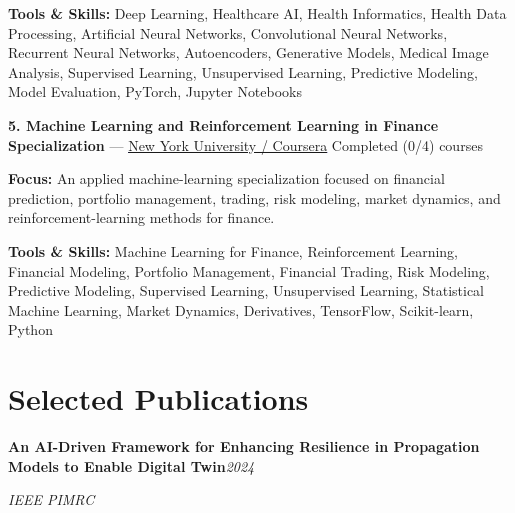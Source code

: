 \documentclass[9pt,letterpaper]{extarticle}
\newcommand{\entry}[2]{\Needspace{4\baselineskip}\textbf{#1}\hfill\textit{#2}\par}
\begin{document}
{\small\textbf{Tools \& Skills:} Deep Learning, Healthcare AI, Health Informatics, Health Data Processing, Artificial Neural Networks, Convolutional Neural Networks, Recurrent Neural Networks, Autoencoders, Generative Models, Medical Image Analysis, Supervised Learning, Unsupervised Learning, Predictive Modeling, Model Evaluation, PyTorch, Jupyter Notebooks\par}
\vspace{2pt}
\noindent\textbf{5. Machine Learning and Reinforcement Learning in Finance Specialization} {\small --- \textcolor{blue}{\underline{\href{https://www.coursera.org/specializations/machine-learning-reinforcement-finance}{New York University / Coursera}}} \textbar{} Completed (0/4) courses}\par
\textbf{Focus:} An applied machine-learning specialization focused on financial prediction, portfolio management, trading, risk modeling, market dynamics, and reinforcement-learning methods for finance.\par
{\small\textbf{Tools \& Skills:} Machine Learning for Finance, Reinforcement Learning, Financial Modeling, Portfolio Management, Financial Trading, Risk Modeling, Predictive Modeling, Supervised Learning, Unsupervised Learning, Statistical Machine Learning, Market Dynamics, Derivatives, TensorFlow, Scikit-learn, Python\par}
\vspace{2pt}
\section{Selected Publications}
\entry{An AI-Driven Framework for Enhancing Resilience in Propagation Models to Enable Digital Twin}{2024}
\textit{IEEE PIMRC}\par
\end{document}
